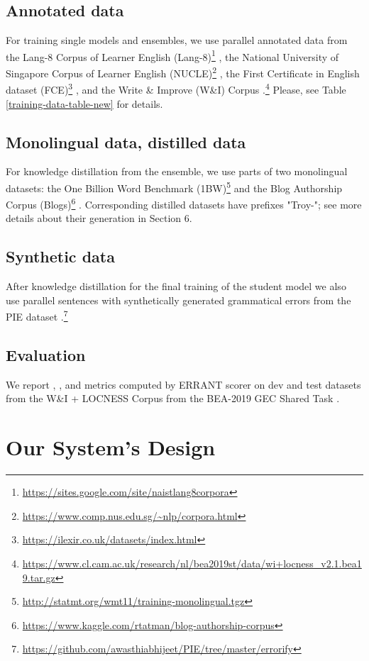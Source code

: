 \documentclass[11pt]{article}
\begin{document}
\subsection{Annotated data} For training single models and ensembles, we use parallel annotated data from the Lang-8 Corpus of Learner English (Lang-8)\footnote{\url{https://sites.google.com/site/naistlang8corpora}} \cite{tajiri2012tense}, the National University of Singapore Corpus of Learner English (NUCLE)\footnote{\url{https://www.comp.nus.edu.sg/~nlp/corpora.html}} \cite{dahlmeier2013building}, the First Certificate in English dataset (FCE)\footnote{\url{https://ilexir.co.uk/datasets/index.html}} \cite{yannakoudakis2011new}, and the Write \& Improve (W\&I) Corpus \cite{bryant2019bea}.\footnote{\url{https://www.cl.cam.ac.uk/research/nl/bea2019st/data/wi+locness_v2.1.bea19.tar.gz}} Please, see Table \ref{training-data-table-new} for details.

\subsection{Monolingual data, distilled data} For knowledge distillation from the ensemble, we use parts of two monolingual datasets: the One Billion Word Benchmark (1BW)\footnote{\url{http://statmt.org/wmt11/training-monolingual.tgz}} \cite{one2013bw} and the Blog Authorship Corpus (Blogs)\footnote{\url{https://www.kaggle.com/rtatman/blog-authorship-corpus}} \cite{schl2005effec}. Corresponding distilled datasets have prefixes "Troy-"; see more details about their generation in Section 6.
\subsection{Synthetic data} 
After knowledge distillation for the final training of the student model we also use parallel sentences with synthetically generated grammatical errors from the PIE dataset \cite{awasthi-etal-2019-parallel}.\footnote{\url{https://github.com/awasthiabhijeet/PIE/tree/master/errorify}}
\subsection{Evaluation} We report , , and   metrics computed by ERRANT scorer \cite{bryant2017automatic} on dev and test datasets from the W\&I + LOCNESS Corpus from the BEA-2019 GEC Shared Task \cite{bryant2019the}. 



\section{Our System's Design}
\end{document}
